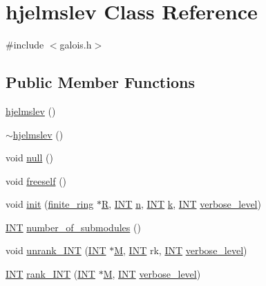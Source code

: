 \hypertarget{classhjelmslev}{}\section{hjelmslev Class Reference}
\label{classhjelmslev}


{\ttfamily \#include $<$galois.\+h$>$}

\subsection*{Public Member Functions}
\begin{DoxyCompactItemize}
\item 
\mbox{\hyperlink{classhjelmslev_a6207bcc3398cfd82b8a458577ca521d0}{hjelmslev}} ()
\item 
\mbox{\hyperlink{classhjelmslev_accc21cc48c4eb982f508a9e349b41441}{$\sim$hjelmslev}} ()
\item 
void \mbox{\hyperlink{classhjelmslev_aab5d00afb800a1764231587f9f032d1c}{null}} ()
\item 
void \mbox{\hyperlink{classhjelmslev_ad18209f7108d6bad92e6a6266f7330f7}{freeself}} ()
\item 
void \mbox{\hyperlink{classhjelmslev_a7b4d32f3bba7d1108e9940a7582009fd}{init}} (\mbox{\hyperlink{classfinite__ring}{finite\+\_\+ring}} $\ast$\mbox{\hyperlink{classhjelmslev_aba7f1127861217a1767e3f0c60e8997d}{R}}, \mbox{\hyperlink{galois_8h_a09fddde158a3a20bd2dcadb609de11dc}{I\+NT}} \mbox{\hyperlink{classhjelmslev_a585f34e9f542a79e21b9feaa45146489}{n}}, \mbox{\hyperlink{galois_8h_a09fddde158a3a20bd2dcadb609de11dc}{I\+NT}} \mbox{\hyperlink{classhjelmslev_a1f59d920302f641dcd25451755c917fb}{k}}, \mbox{\hyperlink{galois_8h_a09fddde158a3a20bd2dcadb609de11dc}{I\+NT}} \mbox{\hyperlink{simeon_8_c_a818073fbcc2f439e7c56952f67386122}{verbose\+\_\+level}})
\item 
\mbox{\hyperlink{galois_8h_a09fddde158a3a20bd2dcadb609de11dc}{I\+NT}} \mbox{\hyperlink{classhjelmslev_a2bc314ecd7196a77cd91d98d7b5ccdac}{number\+\_\+of\+\_\+submodules}} ()
\item 
void \mbox{\hyperlink{classhjelmslev_a2b12e27ee4856b95fb031ead8500e307}{unrank\+\_\+\+I\+NT}} (\mbox{\hyperlink{galois_8h_a09fddde158a3a20bd2dcadb609de11dc}{I\+NT}} $\ast$\mbox{\hyperlink{plane__search_8_c_ad2d23ebd03187a91edd45b1d5e496265}{M}}, \mbox{\hyperlink{galois_8h_a09fddde158a3a20bd2dcadb609de11dc}{I\+NT}} rk, \mbox{\hyperlink{galois_8h_a09fddde158a3a20bd2dcadb609de11dc}{I\+NT}} \mbox{\hyperlink{simeon_8_c_a818073fbcc2f439e7c56952f67386122}{verbose\+\_\+level}})
\item 
\mbox{\hyperlink{galois_8h_a09fddde158a3a20bd2dcadb609de11dc}{I\+NT}} \mbox{\hyperlink{classhjelmslev_a3553bea3124db20b561f1e8340250edd}{rank\+\_\+\+I\+NT}} (\mbox{\hyperlink{galois_8h_a09fddde158a3a20bd2dcadb609de11dc}{I\+NT}} $\ast$\mbox{\hyperlink{plane__search_8_c_ad2d23ebd03187a91edd45b1d5e496265}{M}}, \mbox{\hyperlink{galois_8h_a09fddde158a3a20bd2dcadb609de11dc}{I\+NT}} \mbox{\hyperlink{simeon_8_c_a818073fbcc2f439e7c56952f67386122}{verbose\+\_\+level}})
\end{DoxyCompactItemize}
